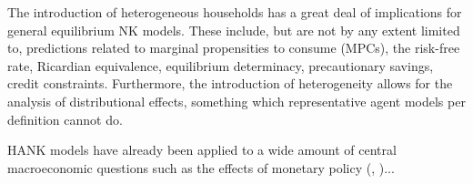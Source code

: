 The introduction of heterogeneous households has a great deal of implications for general equilibrium NK models. These include, but are not by any extent limited to, predictions related to marginal propensities to consume (MPCs), the risk-free rate, Ricardian equivalence, equilibrium determinacy, precautionary savings, credit constraints. Furthermore, the introduction of heterogeneity allows for the analysis of distributional effects, something which representative agent models per definition cannot do. 





 
HANK models have already been applied to a wide amount of central macroeconomic questions such as the effects of monetary policy (\citet{kaplan2018monetary},  \citet{auclert2020micro})...




 
 
 



